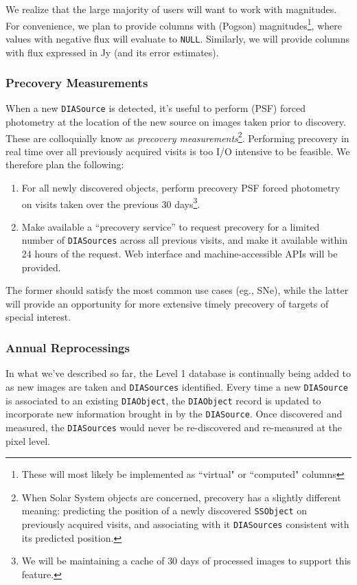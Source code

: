 \documentclass[12pt]{article}
\newcommand{\code}[1]{\texttt{#1}}
\newcommand{\DIASource}{\code{DIASource}\xspace}
\newcommand{\DIASources}{\code{DIASources}\xspace}
\newcommand{\DIAObject}{\code{DIAObject}\xspace}
\newcommand{\DB}{{Level 1 database}\xspace}
\newcommand{\SSObject}{\code{SSObject}\xspace}
\begin{document}
\vspace{1em}

We realize that the large majority of users will want to work with magnitudes.
For convenience, we plan to provide columns with (Pogson)
magnitudes\footnote{These will most likely be implemented as ``virtual" or
``computed" columns}, where values with negative flux will evaluate to
\code{NULL}. Similarly, we will provide columns with flux expressed in Jy (and
its error estimates).

\subsubsection{Precovery Measurements}

When a new \DIASource is detected, it's useful to perform (PSF) forced
photometry at the location of the new source on images taken prior to
discovery. These are colloquially know as {\em precovery
measurements}\footnote{When Solar System objects are concerned, precovery has
a slightly different meaning: predicting the position of a newly discovered
\SSObject on previously acquired visits, and associating with it \DIASources
consistent with its predicted position.}. Performing precovery in real time
over all previously acquired visits is too I/O intensive to be feasible. We
therefore plan the following:
%
\begin{enumerate}
\item For all newly discovered objects, perform precovery PSF forced
      photometry on visits taken over the previous 30 days\footnote{We will be
      maintaining a cache of $30$ days of processed images to support this
      feature.}.
\item Make available a ``precovery service'' to request precovery for a
      limited number of \DIASources across all previous visits, and make it
      available within 24 hours of the request. Web interface and
      machine-accessible APIs will be provided.
\end{enumerate}

The former should satisfy the most common use cases (eg., SNe), while the
latter will provide an opportunity for more extensive timely precovery of
targets of special interest.

\subsubsection{Annual Reprocessings}
\label{sec:l1dbreproc}

In what we've described so far, the \DB is continually being added to as new
images are taken and \DIASources identified. Every time a new \DIASource is
associated to an existing \DIAObject, the \DIAObject record is updated to
incorporate new information brought in by the \DIASource. Once discovered and
measured, the \DIASources would never be re-discovered and re-measured at the
pixel level.
\end{document}
